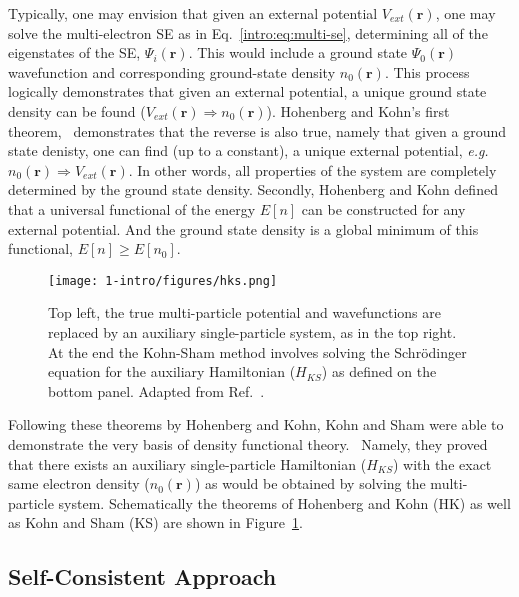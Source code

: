 Typically, one may envision that given an external potential $V_{ext}(\textbf{r})$, one may solve the multi-electron SE as in Eq.~\ref{intro:eq:multi-se}, determining all of the eigenstates of the SE, $\Psi_i({\textbf{r}})$. This would include a ground state $\Psi_0({\textbf{r}})$ wavefunction and corresponding ground-state density $n_0(\textbf{r})$. This process logically demonstrates that given an external potential, a unique ground state density can be found ($V_{ext}(\textbf{r})\Rightarrow n_0(\textbf{r})$). Hohenberg and Kohn's first theorem,~\cite{hohenberg1964inhomogeneous} demonstrates that the reverse is also true, namely that given a ground state denisty, one can find (up to a constant), a unique external potential, \textit{e.g.}\ $n_0(\textbf{r}) \Rightarrow V_{ext}(\textbf{r})$. In other words, all properties of the system are completely determined by the ground state density. Secondly, Hohenberg and Kohn defined that a universal functional of the energy $E[n]$ can be constructed for any external potential. And the ground state density is a global minimum of this functional, $E[n]\geq E[n_0]$.


\begin{figure}[h]
\begin{center}
\texttt{[image: 1-intro/figures/hks.png]}
    \caption{Top left, the true multi-particle potential and wavefunctions are replaced by an auxiliary single-particle system, as in the top right. At the end the Kohn-Sham method involves solving the Schr{\"o}dinger equation for the auxiliary Hamiltonian ($H_{KS}$) as defined on the bottom panel. Adapted from Ref.~\cite{martin2020electronic}.}  \label{intro:fig:hks}
\end{center}
\end{figure}

Following these theorems by Hohenberg and Kohn, Kohn and Sham were able to demonstrate the very basis of density functional theory.~\cite{kohn1965self} Namely, they proved that there exists an auxiliary single-particle Hamiltonian ($H_{KS}$) with the exact same electron density ($n_0(\textbf{r})$) as would be obtained by solving the multi-particle system. Schematically the theorems of Hohenberg and Kohn (HK) as well as Kohn and Sham (KS) are shown in Figure~\ref{intro:fig:hks}.

\subsection{Self-Consistent Approach}

